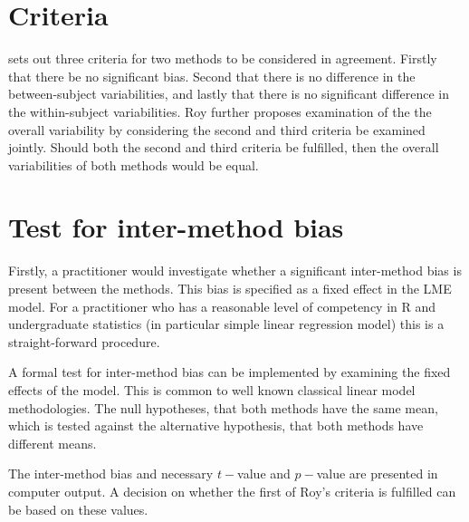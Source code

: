 \documentclass[12pt, a4paper]{report}
\theoremstyle{plain}
\theoremstyle{definition}
\theoremstyle{remark}
\begin{document}
\section{Criteria}
%
%


\citet{ARoy2009} sets out three criteria for two methods to be considered in agreement. Firstly that there be no significant bias. Second that there is no difference in the between-subject variabilities, and lastly that there is no significant difference in the within-subject variabilities. Roy further proposes examination of the the overall variability by considering the second and third criteria be examined jointly. Should both the second and third criteria be fulfilled, then the overall variabilities of both methods would be equal.

\section{Test for inter-method bias}
Firstly, a practitioner would investigate whether a significant inter-method bias is present between the methods. This bias is specified as a fixed effect in the LME model.  For a practitioner who has a reasonable level of competency in R and undergraduate statistics (in particular simple linear regression model) this is a straight-forward procedure.

A formal test for inter-method bias can be implemented by examining the fixed effects of the model. This is common to well known classical linear model methodologies. The null hypotheses, that both methods have the same mean, which is tested against the alternative hypothesis, that both methods have different means.

The inter-method bias and necessary $t-$value and $p-$value are presented in computer output. A decision on whether the first of Roy's criteria is fulfilled can be based on these values.
\end{document}

